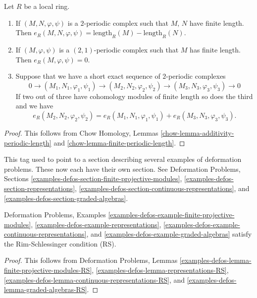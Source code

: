 \begin{lemma}
\label{lemma-periodic-length}
Let $R$ be a local ring.
\begin{enumerate}
\item If $(M, N, \varphi, \psi)$ is a $2$-periodic complex
such that $M$, $N$ have finite length. Then
$e_R(M, N, \varphi, \psi) = \text{length}_R(M) - \text{length}_R(N)$.
\item If $(M, \varphi, \psi)$ is a $(2, 1)$-periodic complex
such that $M$ has finite length. Then
$e_R(M, \varphi, \psi) = 0$.
\item Suppose that we have a short exact sequence of
$2$-periodic complexes
$$
0 \to (M_1, N_1, \varphi_1, \psi_1)
\to (M_2, N_2, \varphi_2, \psi_2)
\to (M_3, N_3, \varphi_3, \psi_3)
\to 0
$$
If two out of three have cohomology modules of finite length so does
the third and we have
$$
e_R(M_2, N_2, \varphi_2, \psi_2) =
e_R(M_1, N_1, \varphi_1, \psi_1) +
e_R(M_3, N_3, \varphi_3, \psi_3).
$$
\end{enumerate}
\end{lemma}

\begin{proof}
This follows from Chow Homology, Lemmas
\ref{chow-lemma-additivity-periodic-length} and
\ref{chow-lemma-finite-periodic-length}.
\end{proof}

\begin{remark}
\label{remark-examples-formal-defos}
This tag used to point to a section describing several examples
of deformation problems. These now each have their own section.
See Deformation Problems, Sections
\ref{examples-defos-section-finite-projective-modules},
\ref{examples-defos-section-representations},
\ref{examples-defos-section-continuous-representations}, and
\ref{examples-defos-section-graded-algebras}.
\end{remark}

\begin{lemma}
\label{lemma-examples-have-RS}
Deformation Problems, Examples
\ref{examples-defos-example-finite-projective-modules},
\ref{examples-defos-example-representations},
\ref{examples-defos-example-continuous-representations}, and
\ref{examples-defos-example-graded-algebras}
satisfy the Rim-Schlessinger condition (RS).
\end{lemma}

\begin{proof}
This follows from Deformation Problems, Lemmas
\ref{examples-defos-lemma-finite-projective-modules-RS},
\ref{examples-defos-lemma-representations-RS},
\ref{examples-defos-lemma-continuous-representations-RS}, and
\ref{examples-defos-lemma-graded-algebras-RS}.
\end{proof}

